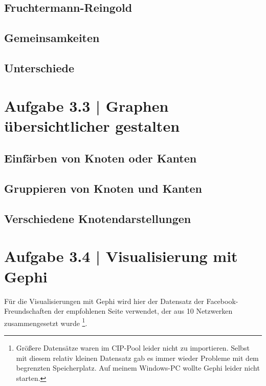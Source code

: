 \documentclass[a4paper,12pt,ngerman]{scrartcl}
\begin{document}
\subsection*{Fruchtermann-Reingold}
\subsection*{Gemeinsamkeiten}
\subsection*{Unterschiede}

\section{Aufgabe 3.3 | Graphen übersichtlicher gestalten}

\subsection*{Einfärben von Knoten oder Kanten}
\subsection*{Gruppieren von Knoten und Kanten}
\subsection*{Verschiedene Knotendarstellungen}

\section{Aufgabe 3.4 | Visualisierung mit Gephi}

%

Für die Visualisierungen mit Gephi wird hier der Datensatz der Facebook-Freundschaften der empfohlenen Seite verwendet, der aus 10 Netzwerken zusammengesetzt wurde \footnote{Größere Datensätze waren im CIP-Pool leider nicht zu importieren. Selbst mit diesem relativ kleinen Datensatz gab es immer wieder Probleme mit dem begrenzten Speicherplatz. Auf meinem Windows-PC wollte Gephi leider nicht starten.}.
\end{document}
